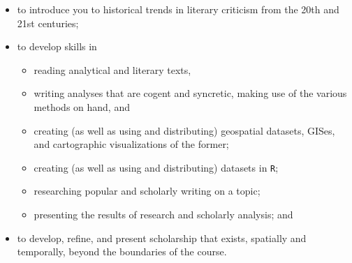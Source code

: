 \begin{itemize}

	\item to introduce you to historical trends in literary criticism from the 20th and 21st centuries; 

  \item to develop skills in 

    \begin{itemize}

			\item reading analytical and literary texts,

			\item writing analyses that are cogent and syncretic, making use of the
various methods on hand, and

			\item creating (as well as using and distributing) geospatial datasets,
GISes, and cartographic visualizations of the former; 

      \item creating (as well as using and distributing) datasets in \texttt{R};
        
      \item researching popular and scholarly writing on a topic;
        
      \item presenting the results of research and scholarly analysis; and

    \end{itemize}

	\item to develop, refine, and present scholarship that exists, spatially and
temporally, beyond the boundaries of the course.

\end{itemize}
